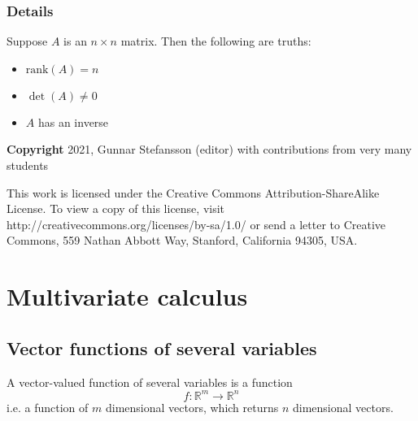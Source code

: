 \documentclass[12pt,a4paper]{article}
\theoremstyle{regla}
\theoremstyle{remark}
\theoremstyle{definition}
\theoremstyle{nonumberbreak}
\begin{document}
\subsubsection{Details}
Suppose $A$ is an $n\times n$ matrix.  Then the following are truths:
\begin{itemize}
\item $\text{rank} (A)= n$
\item $\det(A)\neq 0$
\item $A$ has an inverse
\end{itemize}

{\bf Copyright}
2021, Gunnar Stefansson (editor) with contributions from very many students

This work is licensed under the Creative Commons
Attribution-ShareAlike License. To view a copy of this license, visit
http://creativecommons.org/licenses/by-sa/1.0/ or send a letter to
Creative Commons, 559 Nathan Abbott Way, Stanford, California 94305,
USA.
\clearpage
\section{Multivariate calculus}
\subsection{Vector functions of several variables}
\begin{fbox}
\begin{minipage}{0.97\textwidth}
A vector-valued function of several variables is a function
$$
f: \mathbb{R}^{m} \rightarrow \mathbb{R}^{n}
$$
i.e. a function of $m$ dimensional vectors, which returns $n$ dimensional vectors.
\end{minipage}
\end{fbox}
\end{document}

